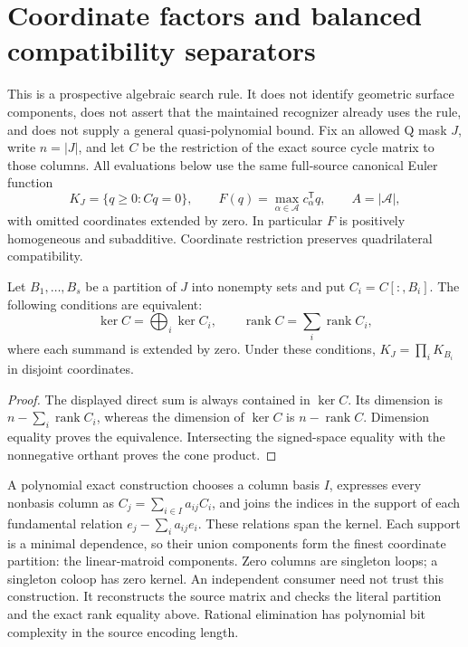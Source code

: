 \section{Coordinate factors and balanced compatibility separators}
\label{sec:euler-coordinate-factors}

This is a prospective algebraic search rule.  It does not identify geometric
surface components, does not assert that the maintained recognizer already
uses the rule, and does not supply a general quasi-polynomial bound.
Fix an allowed Q mask $J$, write $n=|J|$, and let $C$ be the restriction of
the exact source cycle matrix to those columns.  All evaluations below use
the same full-source canonical Euler function
\[
 K_J=\{q\ge0:Cq=0\},\qquad
 F(q)=\max_{\alpha\in\mathcal A}c_\alpha^{\mathsf T}q,
 \qquad A=|\mathcal A|,
\]
with omitted coordinates extended by zero.  In particular $F$ is positively
homogeneous and subadditive.  Coordinate restriction preserves quadrilateral
compatibility.

\begin{proposition}
Let $B_1,\ldots,B_s$ be a partition of $J$ into nonempty sets and put
$C_i=C[:,B_i]$.  The following conditions are equivalent:
\[
 \ker C=\bigoplus_i\ker C_i,
 \qquad
 \operatorname{rank}C=\sum_i\operatorname{rank}C_i,
\]
where each summand is extended by zero.  Under these conditions,
$K_J=\prod_i K_{B_i}$ in disjoint coordinates.
\end{proposition}
\begin{proof}
The displayed direct sum is always contained in $\ker C$.  Its dimension
is $n-\sum_i\operatorname{rank}C_i$, whereas the dimension of $\ker C$ is
$n-\operatorname{rank}C$.  Dimension equality proves the equivalence.
Intersecting the signed-space equality with the nonnegative orthant proves
the cone product.
\end{proof}

A polynomial exact construction chooses a column basis $I$, expresses every
nonbasis column as $C_j=\sum_{i\in I}a_{ij}C_i$, and joins the indices in the
support of each fundamental relation
$e_j-\sum_i a_{ij}e_i$.  These relations span the kernel.  Each support is a
minimal dependence, so their union components form the finest coordinate
partition: the linear-matroid components.  Zero columns are singleton loops;
a singleton coloop has zero kernel.  An independent consumer need not trust
this construction.  It reconstructs the source matrix and checks the literal
partition and the exact rank equality above.  Rational elimination has
polynomial bit complexity in the source encoding length.

